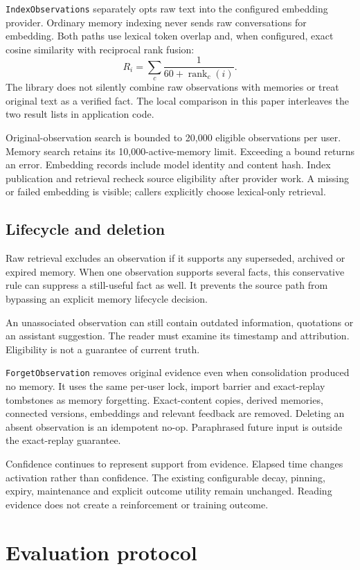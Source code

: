 \documentclass[11pt]{article}
\begin{document}
\texttt{IndexObservations} separately opts raw text into the configured embedding provider. Ordinary memory indexing never sends raw conversations for embedding. Both paths use lexical token overlap and, when configured, exact cosine similarity with reciprocal rank fusion:
\[
R_i=\sum_c \frac{1}{60+\operatorname{rank}_c(i)}.
\]
The library does not silently combine raw observations with memories or treat original text as a verified fact. The local comparison in this paper interleaves the two result lists in application code.

Original-observation search is bounded to 20,000 eligible observations per user. Memory search retains its 10,000-active-memory limit. Exceeding a bound returns an error. Embedding records include model identity and content hash. Index publication and retrieval recheck source eligibility after provider work. A missing or failed embedding is visible; callers explicitly choose lexical-only retrieval.

\subsection{Lifecycle and deletion}
Raw retrieval excludes an observation if it supports any superseded, archived or expired memory. When one observation supports several facts, this conservative rule can suppress a still-useful fact as well. It prevents the source path from bypassing an explicit memory lifecycle decision.

An unassociated observation can still contain outdated information, quotations or an assistant suggestion. The reader must examine its timestamp and attribution. Eligibility is not a guarantee of current truth.

\texttt{ForgetObservation} removes original evidence even when consolidation produced no memory. It uses the same per-user lock, import barrier and exact-replay tombstones as memory forgetting. Exact-content copies, derived memories, connected versions, embeddings and relevant feedback are removed. Deleting an absent observation is an idempotent no-op. Paraphrased future input is outside the exact-replay guarantee.

Confidence continues to represent support from evidence. Elapsed time changes activation rather than confidence. The existing configurable decay, pinning, expiry, maintenance and explicit outcome utility remain unchanged. Reading evidence does not create a reinforcement or training outcome.

\section{Evaluation protocol}
\end{document}
